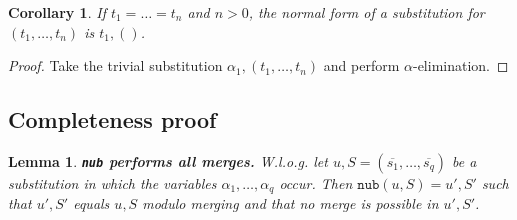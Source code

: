 \documentclass[a4paper, 11pt]{report}
\newtheorem{corollary}{Corollary}
\newtheorem{lemma}{Lemma}
\begin{document}
\begin{corollary}
If $t_1 = \dots = t_n$ and $n > 0$, the normal form of a substitution for $(t_1,\dots,t_n)$ is $t_1,()$.
\label{cor:allTermsEq}
\end{corollary}

\begin{proof}
Take the trivial substitution $\alpha_1,(t_1,\dots,t_n)$ and perform $\alpha$-elimination.
\end{proof}



\medskip


\subsection{Completeness proof}

\begin{lemma}
\textbf{\texttt{nub} performs all merges.}
W.l.o.g. let $u,S = (\overline{s_1},\dots,\overline{s_q})$ be a substitution in which the variables $\alpha_1,\dots,\alpha_q$ occur. Then $\texttt{nub}(u,S) = u',S'$ such that $u',S'$ equals $u,S$ modulo merging and that no merge is possible in $u',S'$.
\label{thm:nubAllMerges}
\end{lemma}
\end{document}
